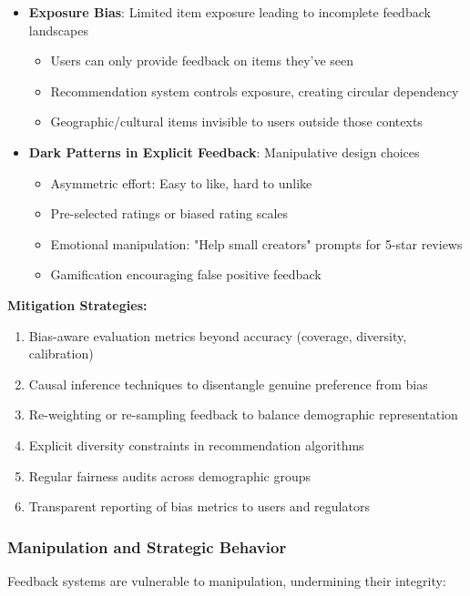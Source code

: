 \begin{itemize}
    \item \textbf{Exposure Bias}: Limited item exposure leading to incomplete feedback landscapes
    \begin{itemize}
        \item Users can only provide feedback on items they've seen
        \item Recommendation system controls exposure, creating circular dependency
        \item Geographic/cultural items invisible to users outside those contexts
    \end{itemize}
    
    \item \textbf{Dark Patterns in Explicit Feedback}: Manipulative design choices
    \begin{itemize}
        \item Asymmetric effort: Easy to like, hard to unlike
        \item Pre-selected ratings or biased rating scales
        \item Emotional manipulation: "Help small creators" prompts for 5-star reviews
        \item Gamification encouraging false positive feedback
    \end{itemize}
\end{itemize}

\textbf{Mitigation Strategies:}
\begin{enumerate}
    \item Bias-aware evaluation metrics beyond accuracy (coverage, diversity, calibration)
    \item Causal inference techniques to disentangle genuine preference from bias
    \item Re-weighting or re-sampling feedback to balance demographic representation
    \item Explicit diversity constraints in recommendation algorithms
    \item Regular fairness audits across demographic groups
    \item Transparent reporting of bias metrics to users and regulators
\end{enumerate}

\subsubsection{Manipulation and Strategic Behavior}

Feedback systems are vulnerable to manipulation, undermining their integrity:

